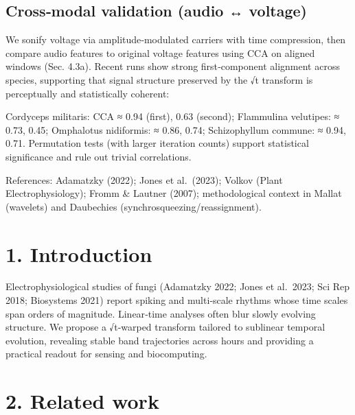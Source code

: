 \documentclass[
  11pt,
]{article}
\begin{document}
\hypertarget{crossmodal-validation-audio-voltage}{%
\subsection{Cross‑modal validation (audio ↔
voltage)}\label{crossmodal-validation-audio-voltage}}

We sonify voltage via amplitude‑modulated carriers with time
compression, then compare audio features to original voltage features
using CCA on aligned windows (Sec. 4.3a). Recent runs show strong
first‑component alignment across species, supporting that signal
structure preserved by the √t transform is perceptually and
statistically coherent:

Cordyceps militaris: CCA ≈ 0.94 (first), 0.63 (second); Flammulina
velutipes: ≈ 0.73, 0.45; Omphalotus nidiformis: ≈ 0.86, 0.74;
Schizophyllum commune: ≈ 0.94, 0.71. Permutation tests (with larger
iteration counts) support statistical significance and rule out trivial
correlations.

References: Adamatzky (2022); Jones et al.~(2023); Volkov (Plant
Electrophysiology); Fromm \& Lautner (2007); methodological context in
Mallat (wavelets) and Daubechies (synchrosqueezing/reassignment).

\hypertarget{introduction}{%
\section{1. Introduction}\label{introduction}}

Electrophysiological studies of fungi (Adamatzky 2022; Jones et
al.~2023; Sci Rep 2018; Biosystems 2021) report spiking and multi‑scale
rhythms whose time scales span orders of magnitude. Linear‑time analyses
often blur slowly evolving structure. We propose a √t‑warped transform
tailored to sublinear temporal evolution, revealing stable band
trajectories across hours and providing a practical readout for sensing
and biocomputing.

\hypertarget{related-work}{%
\section{2. Related work}\label{related-work}}
\end{document}

